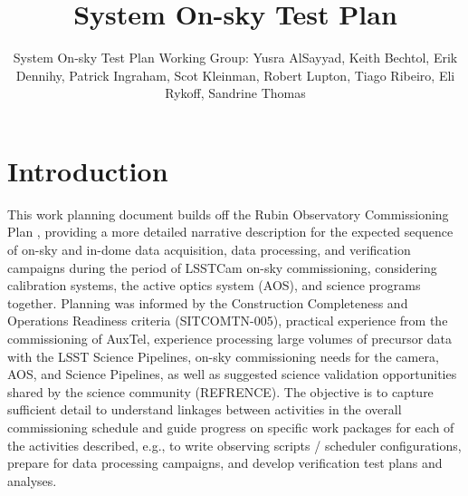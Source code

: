 \documentclass[SE,authoryear,toc,lsstdraft]{lsstdoc}
\title{System On-sky Test Plan}
\author{%
System On-sky Test Plan Working Group: Yusra AlSayyad, Keith Bechtol, Erik Dennihy, Patrick Ingraham, Scot Kleinman, Robert Lupton, Tiago Ribeiro, Eli Rykoff, Sandrine Thomas
}
\date{\vcsDate}
\begin{document}
\maketitle


\section{Introduction}








This work planning document builds off the Rubin Observatory Commissioning Plan , providing a more detailed narrative description for the expected sequence of on-sky and in-dome data acquisition, data processing, and verification campaigns during the period of LSSTCam on-sky commissioning, considering calibration systems, the active optics system (AOS), and science programs together.
Planning was informed by the Construction Completeness and Operations Readiness criteria (SITCOMTN-005), practical experience from the commissioning of AuxTel, experience processing large volumes of precursor data with the LSST Science Pipelines, on-sky commissioning needs for the camera, AOS, and Science Pipelines, as well as suggested science validation opportunities shared by the science community (REFRENCE).
The objective is to capture sufficient detail to understand linkages between activities in the overall commissioning schedule and guide progress on specific work packages for each of the activities described, e.g., to write observing scripts / scheduler configurations, prepare for data processing campaigns, and develop verification test plans and analyses.
\end{document}
